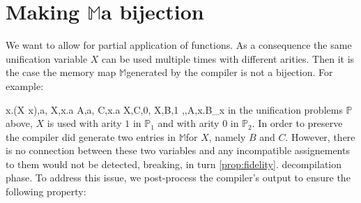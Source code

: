 \documentclass[sigconf,natbib=false,review]{acmart}
\newcommand{\appsep}{\ensuremath{\textcolor{lightgray}{\cdot}}}
\newcommand{\UnifRel}{\ensuremath{\simeq}}
\newcommand{\Ue}{\ensuremath{\UnifRel_m}\xspace}
\newcommand{\linkMacro}[1]{\ensuremath{#1}\texttt{-link}\xspace}
\newcommand{\linketa} {\linkMacro{\eta}}
\newcommand{\lhs}{lhs\xspace}
\newcommand{\rhs}{rhs\xspace}
\newcommand{\mapStore}{\texorpdfstring{\ensuremath{\mathbb{M}}\xspace}{M}}
\newcommand{\foUnifPb}{\ensuremath{\mathbb{P}}\xspace}
\begin{document}
\begin{comment}
\paragraph{Example of \progressetadedup}

A very basic example of \linketa deduplication, is given below:
\printAlll
  {{{\lambda x.(X\appsep x),\lambda x.(Y\appsep x)}}}
  {{{A,C}}}
  {{{X,B,1},
    {Y,D,1}}}
  {{{\eta,,A,\lambda x.B_{x}},
    {\eta,,C,\lambda x.D_{x}}}}

\noindent
The result of $A \Ue{} C$ is that the two \linketa share the same \lhs.
By unifying the two \rhs we get
$\sigma = \{ A~ \mapsto C, B \mapsto D ~\}$.
In turn, given the map \mapStore, this second assignment is decompiled to
$\rho = \{~ X \mapsto Y ~\}$ as expected.
\end{comment}



\section{Making \mapStore a bijection}
\label{sec:invariant1}

We want to allow for partial application of functions.
As a consequence
the same unification variable $X$ can be used multiple times
with different arities.
Then it is the case the
memory map \mapStore generated by the compiler is not
a bijection. For example:
\begin{comment}
%
\printAlll
  {{{\lambda x.\lambda y.(X\appsep y\appsep x),\lambda x.\lambda y.x},
    {\lambda x.(f\appsep (X\appsep x)\appsep x),Y}}}
  {{{A,\lambda x.\lambda y.x},
    {D,F}}}
  {{{X,E,1},
    {Y,F,0},
    {X,C,2}}}
  {{{\eta,,D,\lambda x.(f\appsep E_{x}\appsep x)},
    {\eta,,A,\lambda x.B_{x}},
    {\eta,x,B_{x},\lambda y.C_{y x}}}}
\end{comment}
\printAlll
  {{{\lambda x.(X\appsep x),a},
    {X,\lambda x.a}}}
  {{{A,a},
    {C,\lambda x.a}}}
  {{{X,C,0},
    {X,B,1}}}
  {{{\eta,,A,\lambda x.B_{x}}}}
in the unification problems \foUnifPb above, $X$ is used with arity $1$ in
$\foUnifPb_1$ and with arity $0$ in $\foUnifPb_2$. 
In order to preserve  the compiler
did generate two entries in \mapStore for $X$, namely $B$ and $C$. 
However, there is no connection between these two variables
and any incompatible assignements to them would not be detected, breaking,
in turn \cref{prop:fidelity}. 
decompilation phase.
To address this issue, we post-process the compiler's output
to ensure the following property:
\end{document}
